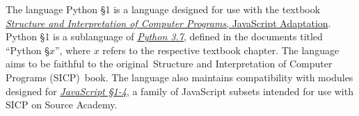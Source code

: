 The language Python \S 1 is a language designed for use with the textbook
\href{https://sourceacademy.org/sicpjs/}{\color{DarkBlue}\emph{Structure and Interpretation
of Computer Programs}, JavaScript Adaptation}.
Python \S 1 is a sublanguage of \href{https://docs.python.org/3.7/reference/grammar.html}{\color{DarkBlue}\emph{Python 3.7}}, defined in the documents titled ``Python \S $x$'', where $x$ refers to the
respective textbook chapter. The language aims to be faithful to the original\ Structure and Interpretation
of Computer Programs (SICP)\ book. The language also maintains compatibility with modules designed for \href{https://docs.sourceacademy.org/javascript/javascript_1/}{\color{DarkBlue}\emph{JavaScript \S 1-4}}, a family of JavaScript subsets intended for use with SICP on Source Academy.
